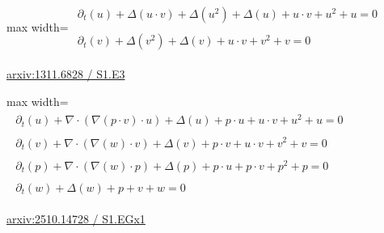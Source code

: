 \documentclass[UTF8,10pt,a4paper,fontset=mac]{ctexart}
\begin{document}
\begin{minipage}{\linewidth}\begin{center}\begin{adjustbox}{max width=\linewidth}$\displaystyle\begin{gathered}\begin{gathered}\partial_{t}(u)+\Delta(u\cdot v)+\Delta(u^{2})+\Delta(u)+u\cdot v+u^{2}+u=0\end{gathered}\\[5pt]\begin{gathered}\partial_{t}(v)+\Delta(v^{2})+\Delta(v)+u\cdot v+v^{2}+v=0\end{gathered}\end{gathered}$\end{adjustbox}\end{center}{\small\href{https://arxiv.org/html/1311.6828#S1.E3}{arxiv:1311.6828 / S1.E3}}\par\end{minipage}\par\vspace{6mm}

\begin{minipage}{\linewidth}\begin{center}\begin{adjustbox}{max width=\linewidth}$\displaystyle\begin{gathered}\begin{gathered}\partial_{t}(u)+\nabla\cdot(\nabla(p\cdot v)\cdot u)+\Delta(u)+p\cdot u+u\cdot v+u^{2}+u=0\end{gathered}\\[5pt]\begin{gathered}\partial_{t}(v)+\nabla\cdot(\nabla(w)\cdot v)+\Delta(v)+p\cdot v+u\cdot v+v^{2}+v=0\end{gathered}\\[5pt]\begin{gathered}\partial_{t}(p)+\nabla\cdot(\nabla(w)\cdot p)+\Delta(p)+p\cdot u+p\cdot v+p^{2}+p=0\end{gathered}\\[5pt]\begin{gathered}\partial_{t}(w)+\Delta(w)+p+v+w=0\end{gathered}\end{gathered}$\end{adjustbox}\end{center}{\small\href{https://arxiv.org/html/2510.14728#S1.EGx1}{arxiv:2510.14728 / S1.EGx1}}\par\end{minipage}\par\vspace{6mm}
\end{document}
